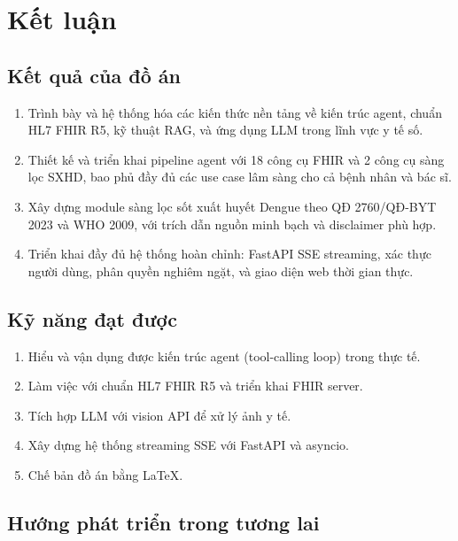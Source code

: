 \documentclass[oneside, a4paper]{book}
\theoremstyle{plain}
\theoremstyle{plain}
\theoremstyle{definition}
\theoremstyle{remark}
\begin{document}
\chapter*{Kết luận}

\section*{Kết quả của đồ án}

\begin{enumerate}
  \item Trình bày và hệ thống hóa các kiến thức nền tảng về kiến trúc agent, chuẩn HL7 FHIR R5, kỹ thuật RAG, và ứng dụng LLM trong lĩnh vực y tế số.
  \item Thiết kế và triển khai pipeline agent với 18 công cụ FHIR và 2 công cụ sàng lọc SXHD, bao phủ đầy đủ các use case lâm sàng cho cả bệnh nhân và bác sĩ.
  \item Xây dựng module sàng lọc sốt xuất huyết Dengue theo QĐ 2760/QĐ-BYT 2023 và WHO 2009, với trích dẫn nguồn minh bạch và disclaimer phù hợp.
  \item Triển khai đầy đủ hệ thống hoàn chỉnh: FastAPI SSE streaming, xác thực người dùng, phân quyền nghiêm ngặt, và giao diện web thời gian thực.
\end{enumerate}

\section*{Kỹ năng đạt được}

\begin{enumerate}
  \item Hiểu và vận dụng được kiến trúc agent (tool-calling loop) trong thực tế.
  \item Làm việc với chuẩn HL7 FHIR R5 và triển khai FHIR server.
  \item Tích hợp LLM với vision API để xử lý ảnh y tế.
  \item Xây dựng hệ thống streaming SSE với FastAPI và asyncio.
  \item Chế bản đồ án bằng \LaTeX.
\end{enumerate}

\section*{Hướng phát triển trong tương lai}
\end{document}
